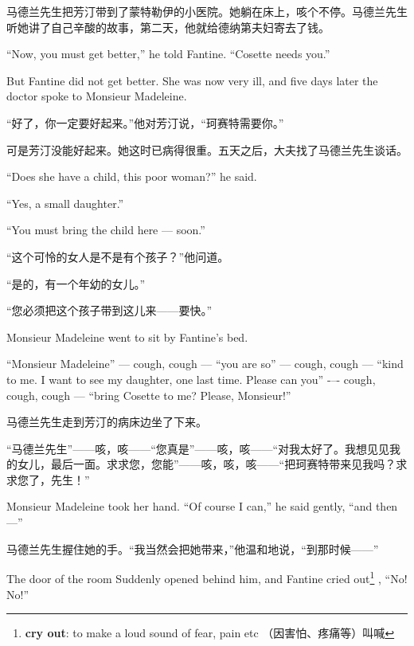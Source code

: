 \documentclass[fontset=ubuntu, zihao=5]{ctexart}
\begin{document}
\begin{paracol}{2}
  \switchcolumn

  马德兰先生把芳汀带到了蒙特勒伊的小医院。她躺在床上，咳个不停。马德兰先生听她讲了自己辛酸的故事，第二天，他就给德纳第夫妇寄去了钱。

  \switchcolumn*

  ``Now, you must get better,'' he told Fantine. ``Cosette needs you.''


  But Fantine did not get better. She was now very ill, and five days later the doctor spoke to Monsieur Madeleine.

  \switchcolumn

  “好了，你一定要好起来。”他对芳汀说，“珂赛特需要你。”


  可是芳汀没能好起来。她这时已病得很重。五天之后，大夫找了马德兰先生谈话。

  \switchcolumn*

  ``Does she have a child, this poor woman?'' he said.


  ``Yes, a small daughter.''


  ``You must bring the child here –-- soon.''

  \switchcolumn

  “这个可怜的女人是不是有个孩子？”他问道。


  “是的，有一个年幼的女儿。”


  “您必须把这个孩子带到这儿来——要快。”

  \switchcolumn*

  Monsieur Madeleine went to sit by Fantine's bed.

  ``Monsieur Madeleine'' –-- cough, cough –-- ``you are so'' –-- cough, cough –-- ``kind to me. I want to see my daughter, one last time. Please can you'' -–- cough, cough, cough --– ``bring Cosette to me? Please, Monsieur!''

  \switchcolumn

  马德兰先生走到芳汀的病床边坐了下来。


  “马德兰先生”——咳，咳——“您真是”——咳，咳——“对我太好了。我想见见我的女儿，最后一面。求求您，您能”——咳，咳，咳——“把珂赛特带来见我吗？求求您了，先生！”

  \switchcolumn*

  Monsieur Madeleine took her hand. ``Of course I can,'' he said gently, ``and
  then ---''

  \switchcolumn

  马德兰先生握住她的手。“我当然会把她带来，”他温和地说，“到那时候——”

  \switchcolumn*

  The door of the room Suddenly opened behind him, and Fantine cried out\footnote{\textbf{cry out}: to make a loud sound of fear, pain etc （因害怕、疼痛等）叫喊}
  , ``No! No!''


\end{paracol}
\end{document}
